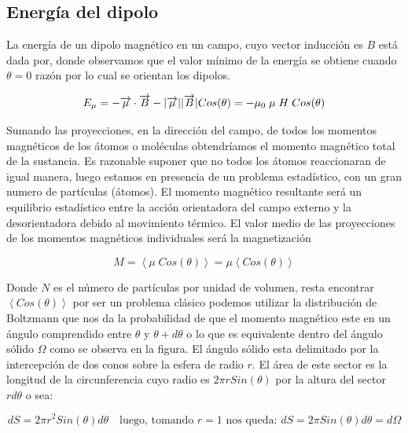 \subsection{Energía del dipolo}

La energía de un dipolo magnético en un campo, cuyo vector inducción es $B$ está dada por, donde observamos que el valor mínimo de la energía se obtiene cuando $\theta=0$ razón por lo cual se orientan los dipolos.

\begin{equation}
	E_{\mu}=-\overrightarrow{\mu}\cdot\overrightarrow{B} -\vert \overrightarrow{\mu} \vert\vert \overrightarrow{B} \vert Cos(\theta) =-\mu_{0}\;\mu\;H\;Cos(\theta)
\end{equation}

Sumando las proyecciones, en la dirección del campo, de todos los momentos magnéticos de los átomos o moléculas obtendríamos el momento magnético total de la sustancia. Es razonable suponer que no todos los átomos reaccionaran de igual manera, luego estamos en presencia de un problema estadístico, con un gran numero de partículas (átomos). El momento magnético resultante será un equilibrio estadístico entre la acción orientadora del campo externo y la desorientadora debido al movimiento térmico. El valor medio de las proyecciones de los momentos magnéticos individuales será la magnetización

\begin{equation}
	M=\left\langle \mu\;Cos(\theta) \right\rangle =\mu \left\langle Cos(\theta) \right\rangle
\end{equation}

Donde $N$ es el número de partículas por unidad de volumen, resta encontrar $\left\langle Cos(\theta) \right\rangle$ por ser un problema clásico podemos utilizar la distribución de Boltzmann que nos da la probabilidad de que el momento magnético este en un ángulo comprendido entre $\theta$ y $\theta + d\theta$ o lo que es equivalente dentro del ángulo sólido $\Omega$ como se observa en la figura. El ángulo sólido esta delimitado por la intercepción de dos conos sobre la esfera de radio $r$. El área de este sector es la longitud de la circunferencia cuyo radio es $2\pi r Sin(\theta)$ por la altura del sector $rd\theta$ o sea:

\begin{equation*}
	dS=2\pi r^{2}Sin(\theta)d\theta \quad \text{luego, tomando $r=1$ nos queda: } dS=2\pi Sin(\theta)d\theta = d\Omega
\end{equation*}

